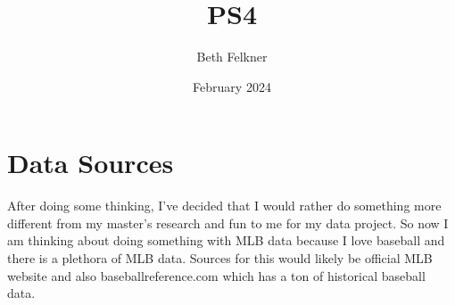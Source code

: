 \documentclass{article}
\title{PS4}
\author{Beth Felkner}
\date{February 2024}
\begin{document}
\maketitle

\section{Data Sources}
After doing some thinking, I've decided that I would rather do something more different from my master's research and fun to me for my data project. So now I am thinking about doing something with MLB data because I love baseball and there is a plethora of MLB data. Sources for this would likely be official MLB website and also baseballreference.com which has a ton of historical baseball data.
\end{document}
